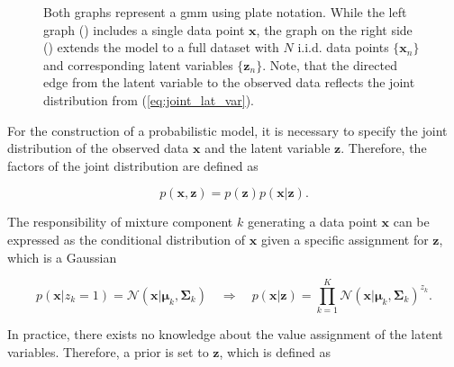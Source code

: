 \documentclass[../../../main.tex]{subfiles}
\begin{document}
\begin{figure}[b!]
    \centering
    \begin{subfigure}[b]{0.4\textwidth}
        \centering
        
        \caption{}
        \label{subfig:plate_single_point}
    \end{subfigure}
    \begin{subfigure}[b]{0.4\textwidth}
        \centering
        
        \caption{}
        \label{subfig:plate_multi_point}
        \end{subfigure}
        \caption[A Gaussian Mixture Model represented in plate notation]{
            Both graphs represent a \gls{gmm} using plate notation. While the left graph () includes a single data point $\bm{x}$, the graph on the right side () extends the model to a full dataset with $N$ i.i.d. data points $\{\bm{x}_n\}$ and corresponding latent variables $\{\bm{z}_n\}$. Note, that the directed edge from the latent variable to the observed data reflects the joint distribution from (\ref{eq:joint_lat_var}).}
         \label{fig:plate_notation}
\end{figure}

For the construction of a probabilistic model, it is necessary to specify the joint distribution of the observed data $\bm{x}$ and the latent variable $\bm{z}$. Therefore, the factors of the joint distribution are defined as

\begin{equation}\label{eq:joint_lat_var}
    p(\bm{x},\bm{z}) = p(\bm{z})p(\bm{x}|\bm{z}).
\end{equation}

The responsibility of mixture component $k$ generating a data point $\bm{x}$ can be expressed as the conditional distribution of $\bm{x}$ given a specific assignment for $\bm{z}$, which is a Gaussian

\begin{equation}\label{eq:cond_lat_var}
    p(\bm{x} | z_k=1) = \mathcal{N}(\bm{x} | \bm{\mu}_k, \bm{\Sigma}_k) \quad \Rightarrow \quad p(\bm{x}|\bm{z}) = \prod\limits^K_{k=1}\mathcal{N}(\bm{x} | \bm{\mu}_k, \bm{\Sigma}_k)^{z_k} .
\end{equation}

In practice, there exists no knowledge about the value assignment of the latent variables. Therefore, a prior is set to $\bm{z}$, which is defined as
\end{document}
